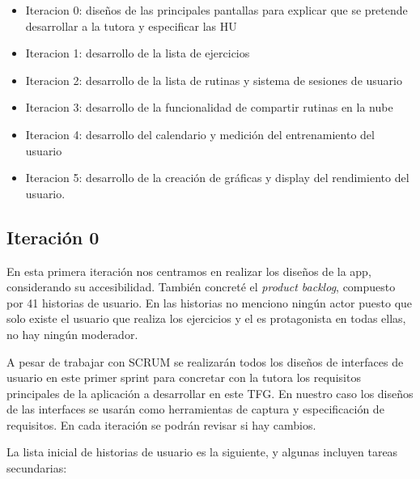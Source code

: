 \begin{itemize}
	\item Iteracion 0: diseños de las principales pantallas para explicar que se pretende desarrollar a la tutora y especificar las HU
	\item Iteracion 1: desarrollo de la lista de ejercicios
	\item Iteracion 2: desarrollo de la lista de rutinas y sistema de sesiones de usuario
	\item Iteracion 3: desarrollo de la funcionalidad de compartir rutinas en la nube
	\item Iteracion 4: desarrollo del calendario y medición del entrenamiento del usuario
	\item Iteracion 5: desarrollo de la creación de gráficas y display del rendimiento del usuario.
\end{itemize}

\subsection{Iteración 0}
En esta primera iteración nos centramos en realizar los diseños de la app, considerando su accesibilidad. También concreté el \textit{product backlog}, compuesto por 41 historias de usuario. En las historias no menciono ningún actor puesto que solo existe el usuario que realiza los ejercicios y el es protagonista en todas ellas, no hay ningún moderador.

A pesar de trabajar con SCRUM se realizarán todos los diseños de interfaces de usuario en este primer sprint para concretar con la tutora los requisitos principales de la aplicación a desarrollar en este TFG. En nuestro caso los diseños de las interfaces se usarán como herramientas de captura y especificación de requisitos. En cada iteración se podrán revisar si hay cambios. 

La lista inicial de historias de usuario es la siguiente, y algunas incluyen tareas secundarias:

